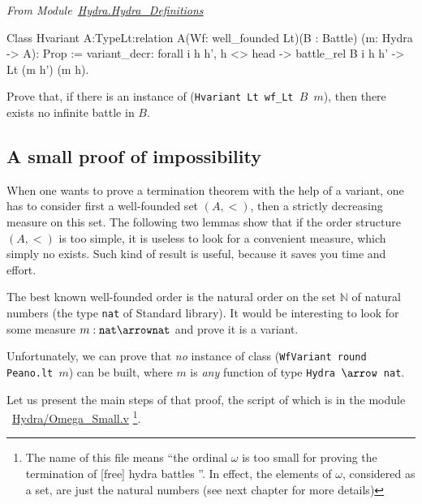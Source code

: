 \vspace{4pt}
\emph{From Module~\href{../theories/html/hydras.Hydra.Hydra_Definitions.html\#Hvariant}{Hydra.Hydra\_Definitions}}


\label{sect:hvariant-def}

\begin{Coqsrc}
Class Hvariant {A:Type}{Lt:relation A}(Wf: well_founded Lt)(B : Battle)
  (m: Hydra -> A):   Prop :=
  {variant_decr: forall i h h',
      h <> head ->
      battle_rel  B i  h h' -> Lt (m h') (m h)}.
\end{Coqsrc}  


\begin{exercise}
 Prove that, if there is an instance of (\texttt{Hvariant Lt wf\_Lt $B$ $m$}), then there exists no infinite battle in  $B$.
\end{exercise}




\subsection{A  small proof of impossibility}

\label{omega-case}

When one wants to prove a termination theorem with the help of a variant, 
one has to consider first a well-founded set $(A,<)$, then a strictly decreasing measure on this set.  The following two lemmas show that if  the order structure $(A,<)$ is too simple, it is useless to look for a convenient measure, which simply no exists. Such kind of result is useful, because it saves you time and effort.


The best known well-founded order is the natural order on the set $\mathbb{N}$ of natural numbers (the type \texttt{nat} of Standard library). It would be interesting to look for some measure $m:\texttt{nat}\arrow\texttt{nat}$ and prove it is a variant.

Unfortunately, we can prove that 
\emph{no} instance of class (\texttt{WfVariant round Peano.lt $m$}) can be built, where
$m$ is \emph{any} function of type \texttt{Hydra $\arrow$ nat}.


Let us present the main steps of that proof, the script of which  is in the module ~\href{../theories/html/hydras.Hydra.Omega_Small.html}{Hydra/Omega\_Small.v} \footnote{ The name of this file means ``the ordinal $\omega$ is too small for proving the termination of [free] hydra battles ''. In effect, the elements of $\omega$, considered as a set, are just the natural numbers (see next chapter for more details)}.

